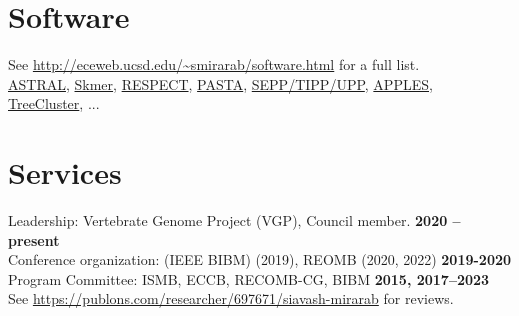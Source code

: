 \documentclass[margin,line,letterpaper]{resume-small}
\begin{document}
\begin{resume}
\begin{small}
 \vspace{-2mm}
 \section{\mysidestyle Software\\ 
}
See \url{http://eceweb.ucsd.edu/~smirarab/software.html} for a full list. \\
\href{https://github.com/smirarab/ASTRAL}{ASTRAL}, 
\href{https://github.com/shahab-sarmashghi/Skmer}{Skmer}, 
\href{https://github.com/shahab-sarmashghi/respect}{RESPECT}, 
\href{https://github.com/smirarab/pasta}{PASTA}, 
\href{https://github.com/smirarab/sepp}{SEPP/TIPP/UPP}, 
\href{https://github.com/balabanmetin/apples}{APPLES}, 
\href{https://github.com/niemasd/TreeCluster}{TreeCluster}, ...

  \vspace{-3mm}
   \section{\mysidestyle Services}
    Leadership: Vertebrate Genome Project (VGP), Council member.   \hfill \textbf{2020 -- present}\vspace{0mm}\\
    Conference organization: (IEEE BIBM) (2019), REOMB (2020, 2022)   \hfill \textbf{2019-2020}\vspace{0mm}\\
    Program Committee: ISMB, ECCB, RECOMB-CG, BIBM  \hfill \textbf{2015, 2017--2023 }\vspace{0mm}\\
   See \url{https://publons.com/researcher/697671/siavash-mirarab} for reviews.\\


\end{small}
\end{resume}
\end{document}
